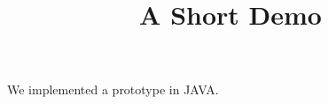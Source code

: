 \documentclass[article]{jss}
\title{A Short Demo}
\begin{document}
We implemented a prototype in JAVA.
\end{document}
